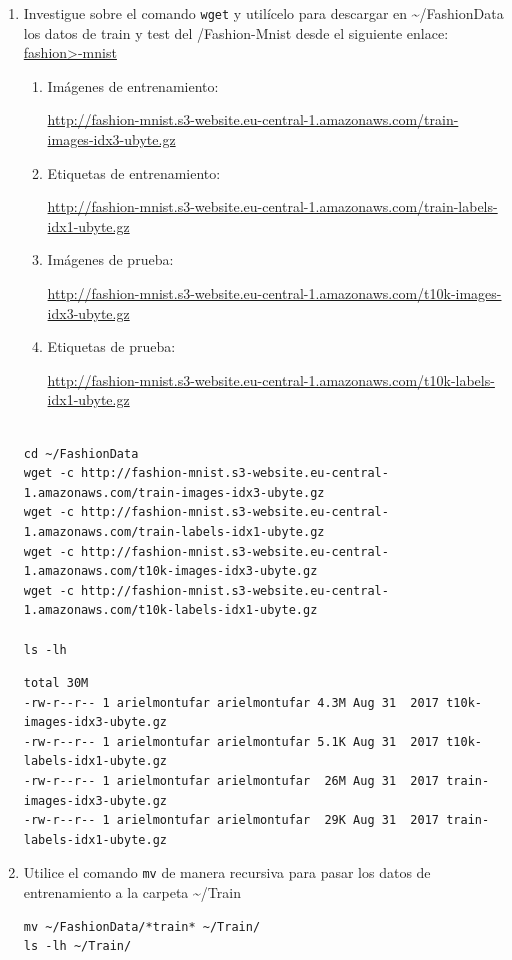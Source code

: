 \documentclass{article}
\begin{document}
\begin{enumerate}
\item Investigue sobre el comando \texttt{wget} y utilícelo para descargar en
\textasciitilde{}/FashionData los datos de train y test del /Fashion-Mnist desde el
siguiente enlace: \href{https://github.com/zalandoresearch/fashion-mnist}{fashion>-mnist}
\begin{enumerate}
\item Imágenes de entrenamiento:

\url{http://fashion-mnist.s3-website.eu-central-1.amazonaws.com/train-images-idx3-ubyte.gz}
\item Etiquetas de entrenamiento:

\url{http://fashion-mnist.s3-website.eu-central-1.amazonaws.com/train-labels-idx1-ubyte.gz}
\item Imágenes de prueba:

\url{http://fashion-mnist.s3-website.eu-central-1.amazonaws.com/t10k-images-idx3-ubyte.gz}
\item Etiquetas de prueba:

\url{http://fashion-mnist.s3-website.eu-central-1.amazonaws.com/t10k-labels-idx1-ubyte.gz}
\end{enumerate}
\begin{verbatim}

cd ~/FashionData
wget -c http://fashion-mnist.s3-website.eu-central-1.amazonaws.com/train-images-idx3-ubyte.gz
wget -c http://fashion-mnist.s3-website.eu-central-1.amazonaws.com/train-labels-idx1-ubyte.gz
wget -c http://fashion-mnist.s3-website.eu-central-1.amazonaws.com/t10k-images-idx3-ubyte.gz
wget -c http://fashion-mnist.s3-website.eu-central-1.amazonaws.com/t10k-labels-idx1-ubyte.gz

ls -lh
\end{verbatim}

\begin{verbatim}
total 30M
-rw-r--r-- 1 arielmontufar arielmontufar 4.3M Aug 31  2017 t10k-images-idx3-ubyte.gz
-rw-r--r-- 1 arielmontufar arielmontufar 5.1K Aug 31  2017 t10k-labels-idx1-ubyte.gz
-rw-r--r-- 1 arielmontufar arielmontufar  26M Aug 31  2017 train-images-idx3-ubyte.gz
-rw-r--r-- 1 arielmontufar arielmontufar  29K Aug 31  2017 train-labels-idx1-ubyte.gz
\end{verbatim}

\item Utilice el comando \texttt{mv} de manera recursiva para pasar los datos de
entrenamiento a la carpeta \textasciitilde{}/Train
\begin{verbatim}
mv ~/FashionData/*train* ~/Train/
ls -lh ~/Train/


\end{verbatim}
\end{enumerate}
\end{document}
